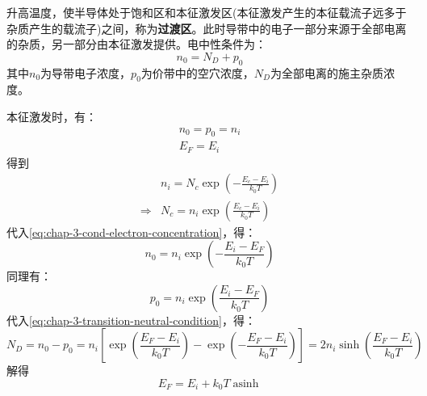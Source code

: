 升高温度，使半导体处于饱和区和本征激发区(本征激发产生的本征载流子远多于杂质产生的载流子)之间，称为\textbf{过渡区}。此时导带中的电子一部分来源于全部电离的杂质，另一部分由本征激发提供。电中性条件为：
\begin{equation}
    n_0=N_D+p_0\label{eq:chap-3-transition-neutral-condition}
\end{equation}
其中$n_0$为导带电子浓度，$p_0$为价带中的空穴浓度，$N_D$为全部电离的施主杂质浓度。

本征激发时，有：
\begin{align}
    n_0=p_0=n_i \\
    E_F=E_i
\end{align}
得到
\begin{align}
    &n_i=N_c\exp{\left(-\frac{E_c-E_i}{k_0T}\right)}\\
    \Longrightarrow&N_c=n_i\exp{\left(\frac{E_c-E_i}{k_0T}\right)}
\end{align}
代入\autoref{eq:chap-3-cond-electron-concentration}，得：
\begin{equation}
    n_0=n_i\exp{\left(-\frac{E_i-E_F}{k_0T}\right)}
\end{equation}
同理有：
\begin{equation}
    p_0=n_i\exp{\left(\frac{E_i-E_F}{k_0T}\right)}
\end{equation}
代入\autoref{eq:chap-3-transition-neutral-condition}，得：
\begin{equation}
    N_D=n_0-p_0=n_i\left[\exp{\left(\frac{E_F-E_i}{k_0T}\right)}-\exp{\left(-\frac{E_F-E_i}{k_0 T}\right)}\right]=2n_i\sinh{\left(\frac{E_F-E_i}{k_0T}\right)}
\end{equation}
解得
\begin{equation}
    E_F=E_i+k_0T\mathop{\mathrm{asinh}{\left(\frac{N_D}{2n_i}\right)}}
\end{equation}

